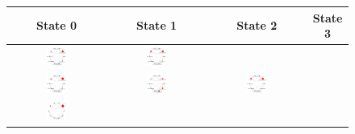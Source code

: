 \begin{figure}
  \centering
  \begin{tabular}{cccc}
    \textbf{State 0} & \textbf{State 1} & \textbf{State 2} & \textbf{State
    3}\\\hline
    \includegraphics[width=0.22\textwidth]{figures/sustain-2state/state0.png}
    &
    \includegraphics[width=0.22\textwidth]{figures/sustain-2state/state1.png}\\
    \includegraphics[width=0.22\textwidth]{figures/sustain-3state/state0.png}
    &
    \includegraphics[width=0.22\textwidth]{figures/sustain-3state/state1.png}
    &
    \includegraphics[width=0.22\textwidth]{figures/sustain-3state/state2.png}\\
    \includegraphics[width=0.22\textwidth]{figures/sustain-4state/state0.png}

\end{tabular}
\end{figure}
